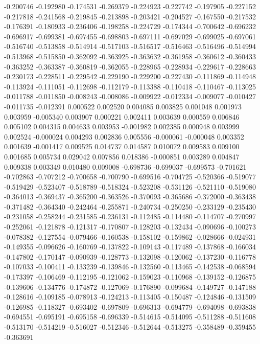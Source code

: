 -0.200746
-0.192980
-0.174531
-0.269379
-0.224923
-0.227742
-0.197905
-0.227152
-0.217818
-0.241568
-0.219845
-0.213898
-0.203421
-0.204527
-0.167550
-0.217532
-0.176391
-0.180933
-0.236406
-0.198258
-0.224729
-0.174344
-0.700642
-0.696232
-0.696917
-0.699381
-0.697455
-0.698803
-0.697111
-0.697029
-0.699025
-0.697061
-0.516740
-0.513858
-0.514914
-0.517103
-0.516517
-0.516463
-0.516496
-0.514994
-0.513968
-0.515850
-0.362092
-0.363925
-0.363632
-0.361958
-0.360612
-0.360433
-0.363252
-0.363387
-0.360819
-0.362055
-0.228965
-0.228934
-0.229617
-0.228663
-0.230173
-0.228511
-0.229542
-0.229190
-0.229200
-0.227430
-0.111869
-0.114948
-0.113924
-0.111051
-0.112698
-0.112179
-0.113388
-0.110418
-0.110467
-0.113025
-0.011788
-0.011850
-0.008243
-0.008086
-0.009922
-0.012334
-0.009077
-0.010427
-0.011735
-0.012391
0.000522
0.002520
0.004085
0.003825
0.001048
0.001973
0.003959
-0.005340
0.003907
0.000221
0.002411
0.003639
0.000559
0.006846
0.005102
0.004315
0.004633
0.003953
-0.001982
0.002385
0.000948
0.003999
0.002524
-0.000024
0.004293
0.002836
0.005556
-0.000061
-0.000048
0.003352
0.001639
-0.001417
0.009525
0.014737
0.014587
0.010072
0.009583
0.009100
0.001685
0.005734
0.029042
0.007856
0.018386
-0.000851
0.003289
0.004847
0.009338
0.003349
0.010480
0.009008
-0.698736
-0.699037
-0.699573
-0.701621
-0.702863
-0.707212
-0.700658
-0.700790
-0.699516
-0.704725
-0.520366
-0.519077
-0.519429
-0.523407
-0.518789
-0.518324
-0.523208
-0.531126
-0.521110
-0.519080
-0.364013
-0.369437
-0.365200
-0.363526
-0.370093
-0.365686
-0.372000
-0.363438
-0.371482
-0.364340
-0.242464
-0.255871
-0.240734
-0.250250
-0.233129
-0.235430
-0.231058
-0.258244
-0.231585
-0.236131
-0.112485
-0.114480
-0.114707
-0.270997
-0.252061
-0.121878
-0.121317
-0.170807
-0.128203
-0.132434
-0.090696
-0.100273
-0.078382
-0.127554
-0.079466
-0.160538
-0.158102
-0.159862
-0.028666
-0.024931
-0.149355
-0.096626
-0.160769
-0.137822
-0.109143
-0.117489
-0.137868
-0.166034
-0.147802
-0.170147
-0.090939
-0.128773
-0.132098
-0.120062
-0.137230
-0.116778
-0.107033
-0.100411
-0.133239
-0.139846
-0.132560
-0.113465
-0.142538
-0.068594
-0.173397
-0.106469
-0.112195
-0.121062
-0.159023
-0.110968
-0.139152
-0.126875
-0.139606
-0.134776
-0.174872
-0.127069
-0.176890
-0.099684
-0.149727
-0.147188
-0.128616
-0.109185
-0.078913
-0.124213
-0.113405
-0.150487
-0.124846
-0.131509
-0.126985
-0.118327
-0.693402
-0.697809
-0.696313
-0.694779
-0.694098
-0.693838
-0.694551
-0.695191
-0.695158
-0.696339
-0.514615
-0.514095
-0.511288
-0.511608
-0.513170
-0.514219
-0.516027
-0.512346
-0.512644
-0.513275
-0.358489
-0.359455
-0.363691
